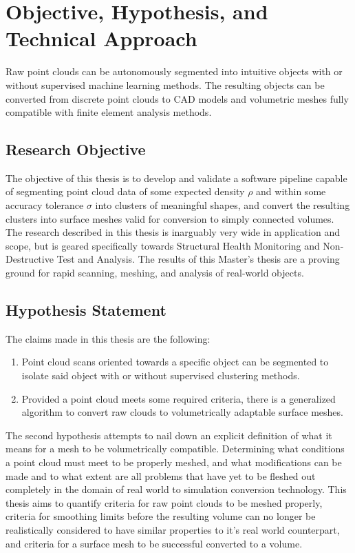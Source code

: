 \documentclass[12pt]{drexelthesis}
\let\Oldsection\section
\renewcommand{\section}{\FloatBarrier\Oldsection}
\begin{document}
\chapter{Objective, Hypothesis, and Technical Approach}
\label{chap:purposestatement}
Raw point clouds can be autonomously segmented into intuitive objects with or without supervised machine learning methods. The resulting objects can be converted from discrete point clouds to CAD models and volumetric meshes fully compatible with finite element analysis methods.

\section{Research Objective}
The objective of this thesis is to develop and validate a software pipeline capable of segmenting point cloud data of some expected density $\rho$ and within some accuracy tolerance $\sigma$ into clusters of meaningful shapes, and convert the resulting clusters into surface meshes valid for conversion to simply connected volumes. The research described in this thesis is inarguably very wide in application and scope, but is geared specifically towards Structural Health Monitoring and Non-Destructive Test and Analysis. The results of this Master's thesis are a proving ground for rapid scanning, meshing, and analysis of real-world objects.

\section{Hypothesis Statement}
The claims made in this thesis are the following:

\begin{enumerate}
	\item Point cloud scans oriented towards a specific object can be segmented to isolate said object with or without supervised clustering methods.
	\item Provided a point cloud meets some required criteria, there is a generalized algorithm to convert raw clouds to volumetrically adaptable surface meshes.
\end{enumerate}

The second hypothesis attempts to nail down an explicit definition of what it means for a mesh to be volumetrically compatible. Determining what conditions a point cloud must meet to be properly meshed, and what modifications can be made and to what extent are all problems that have yet to be fleshed out completely in the domain of real world to simulation conversion technology. This thesis aims to quantify criteria for raw point clouds to be meshed properly, criteria for smoothing limits before the resulting volume can no longer be realistically considered to have similar properties to it's real world counterpart, and criteria for a surface mesh to be successful converted to a volume. 
\end{document}
